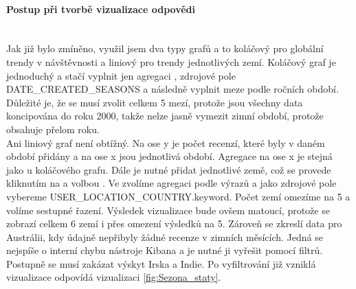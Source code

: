 \documentclass[czech,BP]{thesiskiv}
\begin{document}
\paragraph{Postup při tvorbě vizualizace odpovědi}
\mbox{}\\
Jak již bylo zmíněno, využil jsem dva typy grafů a to koláčový pro globální trendy v návštěvnosti a liniový pro trendy jednotlivých zemí. Koláčový graf je jednoduchý a stačí vyplnit jen agregaci , zdrojové pole DATE\_CREATED\_SEASONS a následně vyplnit meze podle ročních období. Důležité je, že se musí zvolit celkem 5 mezí, protože jsou všechny data koncipována do roku 2000, takže nelze jasně vymezit zimní období, protože obsahuje přelom roku.
\\
Ani liniový graf není obtížný. Na ose y je počet recenzí, které byly v daném období přidány a na ose x jsou jednotlivá období. Agregace na ose x je stejná jako u koláčového grafu. Dále je nutné přidat jednotlivé země, což se provede kliknutím na  a volbou . Ve  zvolíme agregaci podle výrazů a jako zdrojové pole vybereme USER\_LOCATION\_COUNTRY.keyword. Počet zemí omezíme na 5 a volíme sestupné řazení. Výsledek vizualizace bude ovšem matoucí, protože se zobrazí celkem 6 zemí i přes omezení výsledků na 5. Zároveň se zkreslí data pro Austrálii, kdy údajně nepřibyly žádné recenze v zimních měsících. Jedná se nejspíše o interní chybu nástroje Kibana a je nutné ji vyřešit pomocí filtrů. Postupně se musí zakázat výskyt Irska a Indie. Po vyfiltrování již vzniklá vizualizace odpovídá vizualizaci \ref{fig:Sezona_staty}.
\end{document}

